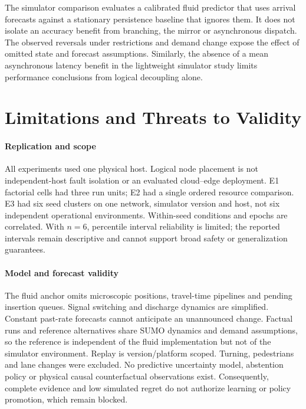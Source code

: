 \documentclass[conference,letterpaper]{IEEEtran}
\begin{document}
The simulator comparison evaluates a calibrated fluid predictor that uses
arrival forecasts against a stationary persistence baseline that ignores them.
It does not isolate an accuracy benefit from branching, the mirror or
asynchronous dispatch. The observed reversals under restrictions and demand
change expose the effect of omitted state and forecast assumptions. Similarly,
the absence of a mean asynchronous latency benefit in the lightweight simulator
study limits performance conclusions from logical decoupling alone.

\section{Limitations and Threats to Validity}
\paragraph{Replication and scope}
All experiments used one physical host. Logical node placement is not
independent-host fault isolation or an evaluated cloud--edge deployment.
E1 factorial cells had three run units; E2 had a single ordered resource
comparison. E3 had six seed clusters on one network, simulator version and host,
not six independent operational environments. Within-seed conditions and epochs
are correlated. With $n=6$, percentile interval reliability is limited;
the reported intervals remain descriptive and cannot support broad safety
or generalization guarantees.

\paragraph{Model and forecast validity}
The fluid anchor omits microscopic positions, travel-time pipelines and pending
insertion queues. Signal switching and discharge dynamics are simplified.
Constant past-rate forecasts cannot anticipate an unannounced change. Factual
runs and reference alternatives share SUMO dynamics and demand assumptions, so
the reference is independent of the fluid implementation but not of the
simulator environment. Replay is version/platform scoped. Turning,
pedestrians and lane changes were excluded. No predictive uncertainty model,
abstention policy or physical causal counterfactual observations exist.
Consequently, complete evidence and low simulated regret do not authorize
learning or policy promotion, which remain blocked.
\end{document}
